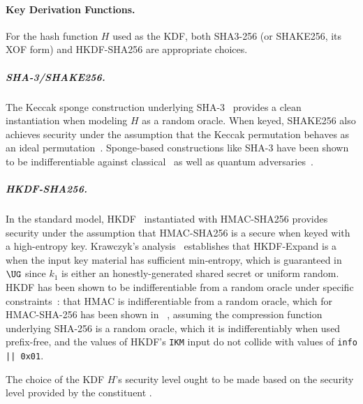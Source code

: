 \paragraph{Key Derivation Functions.}
For the hash function $H$ used as the KDF, both SHA3-256 (or SHAKE256, its
XOF form) and HKDF-SHA256 are appropriate choices.

\subparagraph{SHA-3/SHAKE256.}  The Keccak sponge construction underlying
SHA-3~\cite{FIPS202} provides a clean instantiation when modeling $H$ as a
random oracle. When keyed, SHAKE256 also achieves \prf security under the
assumption that the Keccak permutation behaves as an ideal
permutation~\cite{EC:BDPV08}.  Sponge-based constructions like SHA-3 have
been shown to be indifferentiable against classical~\cite{EC:BDPV08} as well
as quantum adversaries~\cite{EPRINT:ACMT25}.

\subparagraph{HKDF-SHA256.} In the standard model, HKDF~\cite{C:Krawczyk10}
instantiated with HMAC-SHA256 provides \prf security under the assumption
that HMAC-SHA256 is a secure \prf when keyed with a high-entropy
key. Krawczyk's analysis~\cite{C:Krawczyk10} establishes that HKDF-Expand is
a \prf when the input key material has sufficient min-entropy, which is
guaranteed in $\UG$ since $k_1$ is either an honestly-generated \kem shared
secret or uniform random. HKDF has been shown to be indifferentiable from a
random oracle under specific constraints~\cite{EUROSP:LipBlaBha19}: that HMAC
is indifferentiable from a random oracle, which for HMAC-SHA-256 has been
shown in ~\cite{C:DRST12}, assuming the compression function underlying
SHA-256 is a random oracle, which it is indifferentiably when used
prefix-free, and the values of HKDF's \texttt{IKM} input do not collide with
values of \texttt{info || 0x01}.


The choice of the KDF $H$'s security level ought to be made based on the
security level provided by the constituent \kem.
